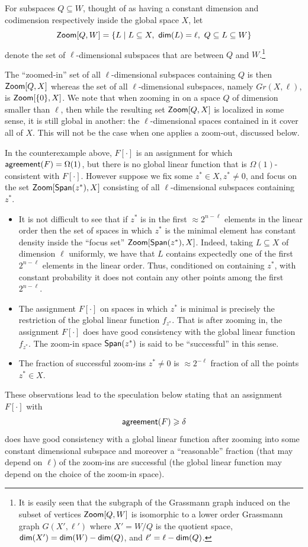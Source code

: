 \documentclass{toc}
\renewcommand\ge{\geqslant}
\newcommand{\Zoom}{{\sf Zoom}}
\def\agr{{\sf agreement}}
\begin{document}
\begin{definition}[Zooming]
For subspaces
$Q \subseteq W$, thought of as having a constant dimension and
codimension respectively inside the global space $X$, let
$$ {\Zoom}[Q, W] = \{ L \mid L \subseteq X, ~{\sf dim}(L) = \ell, ~Q \subseteq L \subseteq W\}$$
denote the set of $\ell$-dimensional subspaces that are between $Q$
and $W$.\footnote{It is easily seen that the subgraph of the Grassmann
  graph induced on the subset of vertices ${\Zoom}[Q, W]$ is
  isomorphic to a lower order Grassmann graph $G(X', \ell')$ where
  $X' = W/Q$ is the quotient space,
  ${\sf dim}(X')= {\sf dim}(W)-{\sf dim}(Q)$, and
  $\ell' = \ell - {\sf dim}(Q)$.}
\end{definition}
 The ``zoomed-in'' set of all
$\ell$-dimensional subspaces containing $Q$ is then ${\Zoom}[Q, X]$
whereas the set of all $\ell$-dimensional subspaces, namely  $Gr(X,\ell)$,
is ${\Zoom}[\{0\}, X]$. We note that when zooming in on a space $Q$
of dimension smaller than $\ell$, then while the resulting set
${\Zoom}[Q, X]$ is localized in some sense, it is still global in
another: the $\ell$-dimensional spaces contained in it cover all of
$X$. This will not be the case when one applies a zoom-out, discussed
below.

\smallskip
In the counterexample above, $F[\cdot]$ is an assignment for which $\agr(F)=\Omega(1)$, but there is no global
linear function that is $\Omega(1)$-consistent with $F[\cdot]$. However suppose we fix some $z^* \in X, z^* \not= 0$, and
focus on the set ${\Zoom}[ {\sf Span}(z^*), X]$ consisting of all $\ell$-dimensional subspaces containing $z^*$.
\begin{itemize}
\item It is not difficult to see that if $z^*$ is in the first $\approx 2^{n-\ell}$ elements in the linear order then the set of spaces in which $z^*$ is the minimal element has constant density inside the ``focus set''
 ${\Zoom}[{\sf Span}(z^*), X]$. Indeed, taking $L\subseteq X$ of dimension $\ell$ uniformly, we have that $L$ contains expectedly
 one of the first $2^{n-\ell}$ elements in the linear order. Thus, conditioned on containing $z^{*}$,
 with constant probability it does not contain any other points among the first $2^{n-\ell}$.
 \item The assignment $F[\cdot]$ on spaces in which $z^*$ is minimal
   is precisely the restriction of the global linear function
   $f_{z^*}$.  That is  after zooming in, the assignment $F[\cdot]$ does have good consistency with the global linear function $f_{z^*}$. The zoom-in space ${\sf Span}(z^*)$ is said to be
  ``successful'' in this sense.
 \item The fraction of successful zoom-ins $z^*\neq 0$ is $\approx 2^{-\ell}$ fraction of all the points $z^*\in X$.
\end{itemize}
These observations lead to the speculation below stating that an assignment $F[\cdot]$ with
%
%
%
\[ \agr(F)\ge\delta  \]   %
does have good consistency with
a global linear function after zooming into some constant dimensional subspace and moreover a ``reasonable'' fraction (that may depend on $\ell$)
of the zoom-ins are successful  (the global linear function may depend on the choice of the zoom-in space).
\end{document}

